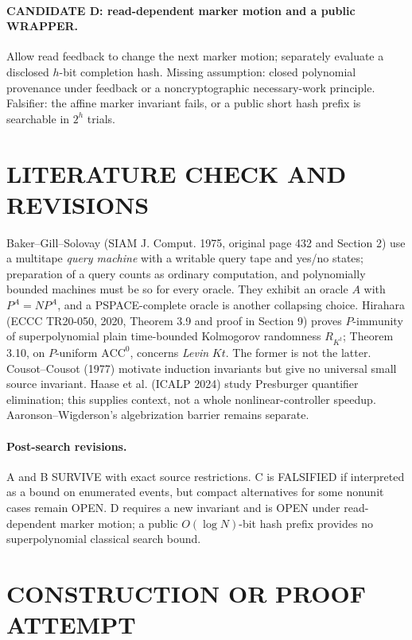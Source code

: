 \documentclass[11pt]{article}
\begin{document}
\paragraph{CANDIDATE D: read-dependent marker motion and a public WRAPPER.}
Allow read feedback to change the next marker motion; separately evaluate a disclosed $h$-bit completion hash. Missing assumption: closed polynomial provenance under feedback or a noncryptographic necessary-work principle. Falsifier: the affine marker invariant fails, or a public short hash prefix is searchable in $2^h$ trials.

\section{LITERATURE CHECK AND REVISIONS}
Baker--Gill--Solovay (SIAM J. Comput. 1975, original page 432 and Section 2) use a multitape \emph{query machine} with a writable query tape and yes/no states; preparation of a query counts as ordinary computation, and polynomially bounded machines must be so for every oracle. They exhibit an oracle $A$ with $P^A=NP^A$, and a PSPACE-complete oracle is another collapsing choice. Hirahara (ECCC TR20-050, 2020, Theorem 3.9 and proof in Section 9) proves $P$-immunity of superpolynomial plain time-bounded Kolmogorov randomness $R_{K^t}$; Theorem 3.10, on $P$-uniform $\mathrm{ACC}^0$, concerns \emph{Levin} $Kt$. The former is not the latter. Cousot--Cousot (1977) motivate induction invariants but give no universal small source invariant. Haase et al. (ICALP 2024) study Presburger quantifier elimination; this supplies context, not a whole nonlinear-controller speedup. Aaronson--Wigderson's algebrization barrier remains separate.
\paragraph{Post-search revisions.}
A and B SURVIVE with exact source restrictions. C is FALSIFIED if interpreted as a bound on enumerated events, but compact alternatives for some nonunit cases remain OPEN. D requires a new invariant and is OPEN under read-dependent marker motion; a public $O(\log N)$-bit hash prefix provides no superpolynomial classical search bound.

\section{CONSTRUCTION OR PROOF ATTEMPT}
\end{document}

